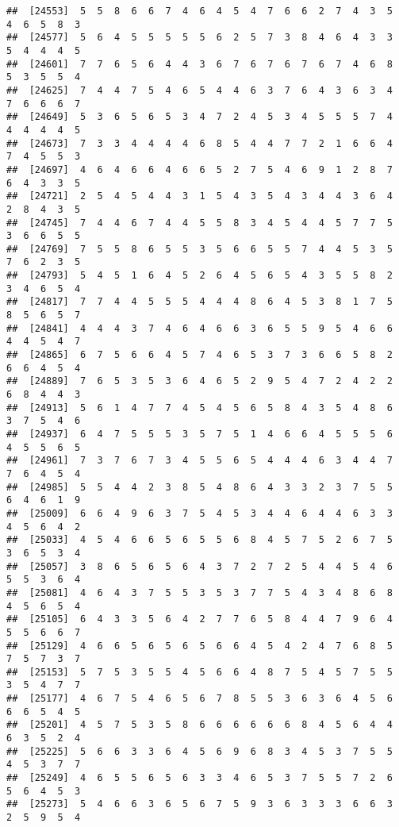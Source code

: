 \documentclass[
]{book}
\begin{document}
\begin{verbatim}
##  [24553]  5  5  8  6  6  7  4  6  4  5  4  7  6  6  2  7  4  3  5  4  6  5  8  3
##  [24577]  5  6  4  5  5  5  5  5  6  2  5  7  3  8  4  6  4  3  3  5  4  4  4  5
##  [24601]  7  7  6  5  6  4  4  3  6  7  6  7  6  7  6  7  4  6  8  5  3  5  5  4
##  [24625]  7  4  4  7  5  4  6  5  4  4  6  3  7  6  4  3  6  3  4  7  6  6  6  7
##  [24649]  5  3  6  5  6  5  3  4  7  2  4  5  3  4  5  5  5  7  4  4  4  4  4  5
##  [24673]  7  3  3  4  4  4  4  6  8  5  4  4  7  7  2  1  6  6  4  7  4  5  5  3
##  [24697]  4  6  4  6  6  4  6  6  5  2  7  5  4  6  9  1  2  8  7  6  4  3  3  5
##  [24721]  2  5  4  5  4  4  3  1  5  4  3  5  4  3  4  4  3  6  4  2  8  4  3  5
##  [24745]  7  4  4  6  7  4  4  5  5  8  3  4  5  4  4  5  7  7  5  3  6  6  5  5
##  [24769]  7  5  5  8  6  5  5  3  5  6  6  5  5  7  4  4  5  3  5  7  6  2  3  5
##  [24793]  5  4  5  1  6  4  5  2  6  4  5  6  5  4  3  5  5  8  2  3  4  6  5  4
##  [24817]  7  7  4  4  5  5  5  4  4  4  8  6  4  5  3  8  1  7  5  8  5  6  5  7
##  [24841]  4  4  4  3  7  4  6  4  6  6  3  6  5  5  9  5  4  6  6  4  4  5  4  7
##  [24865]  6  7  5  6  6  4  5  7  4  6  5  3  7  3  6  6  5  8  2  6  6  4  5  4
##  [24889]  7  6  5  3  5  3  6  4  6  5  2  9  5  4  7  2  4  2  2  6  8  4  4  3
##  [24913]  5  6  1  4  7  7  4  5  4  5  6  5  8  4  3  5  4  8  6  3  7  5  4  6
##  [24937]  6  4  7  5  5  5  3  5  7  5  1  4  6  6  4  5  5  5  6  4  5  5  6  5
##  [24961]  7  3  7  6  7  3  4  5  5  6  5  4  4  4  6  3  4  4  7  7  6  4  5  4
##  [24985]  5  5  4  4  2  3  8  5  4  8  6  4  3  3  2  3  7  5  5  6  4  6  1  9
##  [25009]  6  6  4  9  6  3  7  5  4  5  3  4  4  6  4  4  6  3  3  4  5  6  4  2
##  [25033]  4  5  4  6  6  5  6  5  5  6  8  4  5  7  5  2  6  7  5  3  6  5  3  4
##  [25057]  3  8  6  5  6  5  6  4  3  7  2  7  2  5  4  4  5  4  6  5  5  3  6  4
##  [25081]  4  6  4  3  7  5  5  3  5  3  7  7  5  4  3  4  8  6  8  4  5  6  5  4
##  [25105]  6  4  3  3  5  6  4  2  7  7  6  5  8  4  4  7  9  6  4  5  5  6  6  7
##  [25129]  4  6  6  5  6  5  6  5  6  6  4  5  4  2  4  7  6  8  5  7  5  7  3  7
##  [25153]  5  7  5  3  5  5  4  5  6  6  4  8  7  5  4  5  7  5  5  3  5  4  7  7
##  [25177]  4  6  7  5  4  6  5  6  7  8  5  5  3  6  3  6  4  5  6  6  6  5  4  5
##  [25201]  4  5  7  5  3  5  8  6  6  6  6  6  6  8  4  5  6  4  4  6  3  5  2  4
##  [25225]  5  6  6  3  3  6  4  5  6  9  6  8  3  4  5  3  7  5  5  4  5  3  7  7
##  [25249]  4  6  5  5  6  5  6  3  3  4  6  5  3  7  5  5  7  2  6  5  6  4  5  3
##  [25273]  5  4  6  6  3  6  5  6  7  5  9  3  6  3  3  3  6  6  3  2  5  9  5  4

\end{verbatim}
\end{document}
